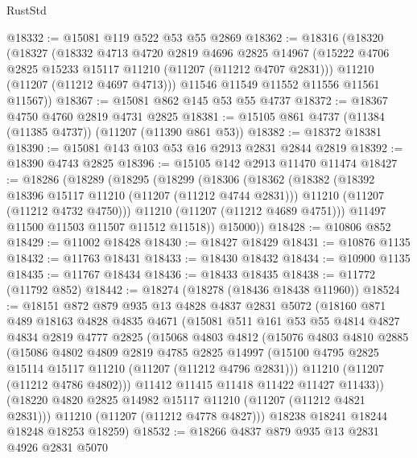 \begin{lexlean}{RustStd}
\begin{coremodule}
@18332 := @15081 @119 @522 @53 @55 @2869
@18362 := @18316
    (@18320
      (@18327
        (@18332
          @4713
          @4720
          @2819
          @4696
          @2825
          @14967
          (@15222 @4706 @2825 @15233 @15117 @11210 (@11207 (@11212 @4707 @2831)))
          @11210
          (@11207 (@11212 @4697 @4713)))
        @11546
        @11549
        @11552
        @11556
        @11561
        @11567))
@18367 := @15081 @862 @145 @53 @55 @4737
@18372 := @18367 @4750 @4760 @2819 @4731 @2825
@18381 := @15105 @861 @4737 (@11384 (@11385 @4737)) (@11207 (@11390 @861 @53))
@18382 := @18372 @18381
@18390 := @15081 @143 @103 @53 @16 @2913 @2831 @2844 @2819
@18392 := @18390 @4743 @2825
@18396 := @15105 @142 @2913 @11470 @11474
@18427 := @18286
    (@18289
      (@18295
        (@18299
          (@18306
            (@18362
              (@18382
                (@18392 @18396 @15117 @11210 (@11207 (@11212 @4744 @2831)))
                @11210
                (@11207 (@11212 @4732 @4750)))
              @11210
              (@11207 (@11212 @4689 @4751)))
            @11497
            @11500
            @11503
            @11507
            @11512
            @11518))
        @15000))
@18428 := @10806 @852
@18429 := @11002 @18428
@18430 := @18427 @18429
@18431 := @10876 @1135
@18432 := @11763 @18431
@18433 := @18430 @18432
@18434 := @10900 @1135
@18435 := @11767 @18434
@18436 := @18433 @18435
@18438 := @11772 (@11792 @852)
@18442 := @18274 (@18278 (@18436 @18438 @11960))
@18524 := @18151
    @872
    @879
    @935
    @13
    @4828
    @4837
    @2831
    @5072
    (@18160
      @871
      @489
      @18163
      @4828
      @4835
      @4671
      (@15081
        @511
        @161
        @53
        @55
        @4814
        @4827
        @4834
        @2819
        @4777
        @2825
        (@15068
          @4803
          @4812
          (@15076
            @4803
            @4810
            @2885
            (@15086
              @4802
              @4809
              @2819
              @4785
              @2825
              @14997
              (@15100 @4795 @2825 @15114 @15117 @11210 (@11207 (@11212 @4796 @2831)))
              @11210
              (@11207 (@11212 @4786 @4802)))
            @11412
            @11415
            @11418
            @11422
            @11427
            @11433))
        (@18220 @4820 @2825 @14982 @15117 @11210 (@11207 (@11212 @4821 @2831)))
        @11210
        (@11207 (@11212 @4778 @4827)))
      @18238
      @18241
      @18244
      @18248
      @18253
      @18259)
@18532 := @18266 @4837 @879 @935 @13 @2831 @4926 @2831 @5070

\end{coremodule}
\end{lexlean}
